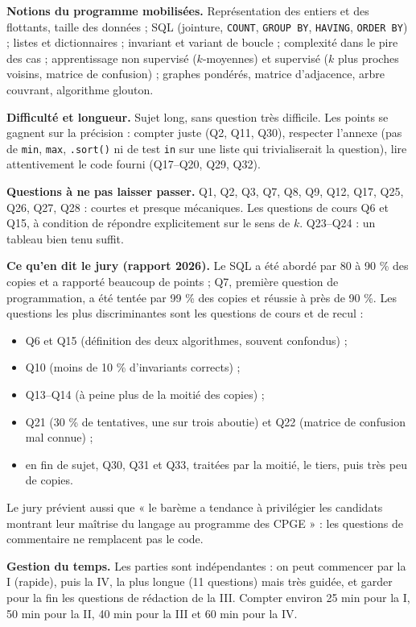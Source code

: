 \documentclass[11pt,a4paper]{article}
\providecommand{\tightlist}{\setlength{\itemsep}{0pt}\setlength{\parskip}{0pt}}
\begin{document}
\textbf{Notions du programme mobilisées.} Représentation des entiers et des flottants, taille des données ; SQL (jointure, \texttt{COUNT}, \texttt{GROUP\ BY}, \texttt{HAVING}, \texttt{ORDER\ BY}) ; listes et dictionnaires ; invariant et variant de boucle ; complexité dans le pire des cas ; apprentissage non supervisé (\(k\)-moyennes) et supervisé (\(k\) plus proches voisins, matrice de confusion) ; graphes pondérés, matrice d'adjacence, arbre couvrant, algorithme glouton.

\textbf{Difficulté et longueur.} Sujet long, sans question très difficile. Les points se gagnent sur la précision : compter juste (Q2, Q11, Q30), respecter l'annexe (pas de \texttt{min}, \texttt{max}, \texttt{.sort()} ni de test \texttt{in} sur une liste qui trivialiserait la question), lire attentivement le code fourni (Q17--Q20, Q29, Q32).

\textbf{Questions à ne pas laisser passer.} Q1, Q2, Q3, Q7, Q8, Q9, Q12, Q17, Q25, Q26, Q27, Q28 : courtes et presque mécaniques. Les questions de cours Q6 et Q15, à condition de répondre explicitement sur le sens de \(k\). Q23--Q24 : un tableau bien tenu suffit.

\textbf{Ce qu'en dit le jury (rapport 2026).} Le SQL a été abordé par 80 à 90 \% des copies et a rapporté beaucoup de points ; Q7, première question de programmation, a été tentée par 99 \% des copies et réussie à près de 90 \%. Les questions les plus discriminantes sont les questions de cours et de recul :

\begin{itemize}
\tightlist
\item
  Q6 et Q15 (définition des deux algorithmes, souvent confondus) ;
\item
  Q10 (moins de 10 \% d'invariants corrects) ;
\item
  Q13--Q14 (à peine plus de la moitié des copies) ;
\item
  Q21 (30 \% de tentatives, une sur trois aboutie) et Q22 (matrice de confusion mal connue) ;
\item
  en fin de sujet, Q30, Q31 et Q33, traitées par la moitié, le tiers, puis très peu de copies.
\end{itemize}

Le jury prévient aussi que « le barème a tendance à privilégier les candidats montrant leur maîtrise du langage au programme des CPGE » : les questions de commentaire ne remplacent pas le code.

\textbf{Gestion du temps.} Les parties sont indépendantes : on peut commencer par la I (rapide), puis la IV, la plus longue (11 questions) mais très guidée, et garder pour la fin les questions de rédaction de la III. Compter environ 25 min pour la I, 50 min pour la II, 40 min pour la III et 60 min pour la IV.
\end{document}

